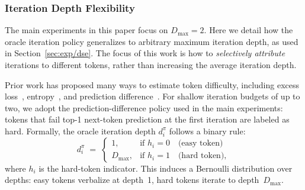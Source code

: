 \subsubsection{Iteration Depth Flexibility}
\label{sec:appendix/oracle_policy}

The main experiments in this paper focus on $D_{\max}=2$.
Here we detail how the oracle iteration policy generalizes to arbitrary maximum iteration depth, as used in Section~\ref{sec:exp/dse}.
The focus of this work is how to \emph{selectively attribute} iterations to different tokens, rather than increasing the average iteration depth.

Prior work has proposed many ways to estimate token difficulty, including excess loss~\citep{lin2024rho, xie2023doremi}, entropy~\citep{wang2025beyond, chen2023eeLLM}, and prediction difference~\citep{fu2025r2r}.
For shallow iteration budgets of up to two, we adopt the prediction-difference policy used in the main experiments: tokens that fail top-1 next-token prediction at the first iteration are labeled as hard.
Formally, the oracle iteration depth $d_i^\pi$ follows a binary rule:
\begin{equation}
    d_i^\pi \;=\; \begin{cases}
        1, & \text{if } h_i = 0 \quad \text{(easy token)} \\
        D_{\max}, & \text{if } h_i = 1 \quad \text{(hard token)} ,
    \end{cases}
\end{equation}
where $h_i$ is the hard-token indicator.
This induces a Bernoulli distribution over depths: easy tokens verbalize at depth~1, hard tokens iterate to depth~$D_{\max}$.

